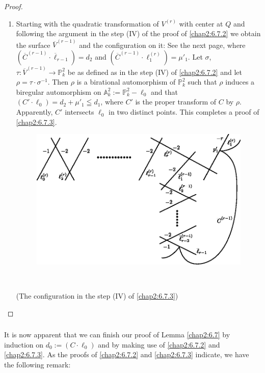\begin{proof}
\begin{enumerate}
\item Starting with the quadratic transformation of $V^{(r)}$ with
  center at $Q$ and following the argument in the step (IV) of the
  proof of \ref{chap2:6.7.2} we obtain the surface $\overline{V}^{(r-1)}$
  and the configuration on it: See the next page, where
  $(\overline{C}^{(r-1)}\cdot \overline{\ell}_{r-1})=d_{2}$ and
  $(\overline{C}^{(r-1)}\cdot\ell^{(r)}_{1})=\mu'_{1}$. Let $\sigma$,
  $\tau:\overline{V}^{(r-1)}\to \mathbb{P}^{2}_{k}$ be as defined as
  in the step (IV) of \ref{chap2:6.7.2} and let
  $\rho=\tau\cdot\sigma^{-1}$. Then $\rho$ is a birational
  automorphism of $\mathbb{P}^{2}_{k}$ such that $\rho$ induces a
  biregular automorphism on
  $\mathbb{A}^{2}_{k}:=\mathbb{P}^{2}_{k}-\ell_{0}$ and that
  $(C'\cdot\ell_{0})=d_{2}+\mu'_{1}\leqq d_{1}$, where $C'$ is the
  proper transform of $C$ by $\rho$. Apparently, $C'$ intersects
  $\ell_{0}$ in two distinct points. This completes a proof of
  \ref{chap2:6.7.3}.
\begin{figure}[H]
\centering
\includegraphics[scale=.95]{figures/chap2-fig26.eps}
\end{figure}\pageoriginale\

\centerline{ (The configuration in the step (IV) of \ref{chap2:6.7.3})}
\end{enumerate}
\end{proof}

\subsubsection{}\label{chap2:6.7.4}
It is now apparent that we can finish our proof of Lemma \ref{chap2:6.7}
by induction on $d_{0}:=(C\cdot\ell_{0})$ and by making use of
\ref{chap2:6.7.2} and \ref{chap2:6.7.3}. As the proofs of \ref{chap2:6.7.2} and
\ref{chap2:6.7.3} indicate, we have the following remark:

